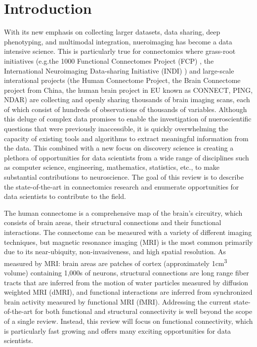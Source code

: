 \section*{Introduction}

With its new emphasis on collecting larger datasets, data sharing, deep phenotyping, and multimodal integration, nueroimaging has become a data intensive science. This is particularly true for connectomics where grass-root initiatives (e.g.the 1000 Functional Connectomes Project (FCP) \cite{Biswal2010}, the International Neuroimaging Data-sharing Initiative (INDI) \cite{Mennes2013}) and large-scale interational projects (the Human Connectome Project\cite{Sotiropoulus2013,VanEssen2012}, the Brain Connectome project from China\cite{Jiang2013}, the human brain project in EU known as CONNECT\cite{Assaf2013}, PING, NDAR) are collecting and openly sharing thousands of brain imaging scans, each of which consist of hundreds of observations of thousands of variables. Although this deluge of complex data promises to enable the investigation of nueroscientific questions that were previously inaccessible, it is quickly overwhelming the capacity of existing tools and algorithms to extract meaningful information from the data. This combined with a new focus on discovery science is creating a plethora of opportunities for data scientists from a wide range of disciplines such as computer science, engineering, mathematics, statistics, etc., to make substantial contributions to neuroscience. The goal of this review is to describe the state-of-the-art in connectomics research and enumerate opportunities for data scientists to contribute to the field.

The human connectome is a comprehensive map of the brain's circuitry, which consists of brain areas, their structural connections and their functional interactions. The connectome can be measured with a variety of different imaging techniques, but magnetic resonance imaging (MRI) is the most common primarily due to its near-ubiquity, non-invasiveness, and high spatial resolution. As measured by MRI: brain areas are patches of cortex (approximately 1\si{\centi\meter\cubed} volume) containing 1,000s of neurons, structural connections are long range fiber tracts that are inferred from the motion of water particles measured by diffusion weighted MRI (dMRI), and functional interactions are inferred from synchronized brain activity measured by functional MRI (fMRI). Addressing the current state-of-the-art for both functional and structural connectivity is well beyond the scope of a single review. Instead, this review will focus on functional connectivity, which is particularly fast growing and offers many exciting opportunities for data scientists.

